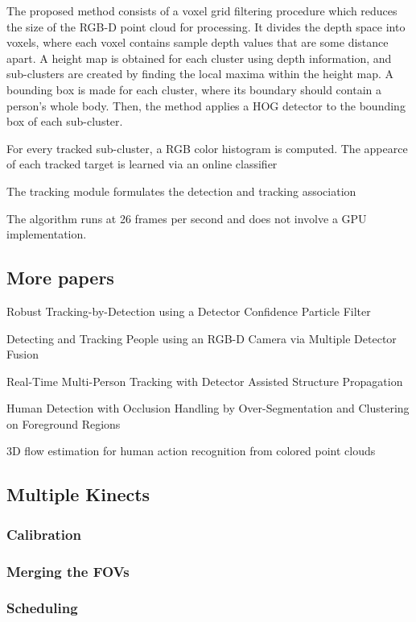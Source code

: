 \documentclass[paper=a4, fontsize=11pt]{scrartcl}
\numberwithin{equation}{section}		%
\numberwithin{figure}{section}			%
\numberwithin{table}{section}				%
\begin{document}
The proposed method consists of a voxel grid filtering procedure which reduces the size of the RGB-D point cloud for processing. It divides the depth space into voxels, where each voxel contains sample depth values that are some distance apart. A height map is obtained for each cluster using depth information, and sub-clusters are created by finding the local maxima within the height map. A bounding box is made for each cluster, where its boundary should contain a person's whole body. Then, the method applies a HOG detector to the bounding box of each sub-cluster.

For every tracked sub-cluster, a RGB color histogram is computed. The appearce of each tracked target is learned via an online classifier

The tracking module formulates the detection and tracking association

The algorithm runs at 26 frames per second and does not involve a GPU implementation.



\subsection{More papers}

Robust Tracking-by-Detection using a Detector Confidence Particle Filter

Detecting and Tracking People using an RGB-D Camera via Multiple Detector
Fusion

Real-Time Multi-Person Tracking with Detector Assisted Structure Propagation

Human Detection with Occlusion Handling by Over-Segmentation and Clustering on Foreground Regions

3D flow estimation for human action recognition from colored point clouds

\subsection{Multiple Kinects}

\subsubsection{Calibration}

\subsubsection{Merging the FOVs}

\subsubsection{Scheduling}
\end{document}
